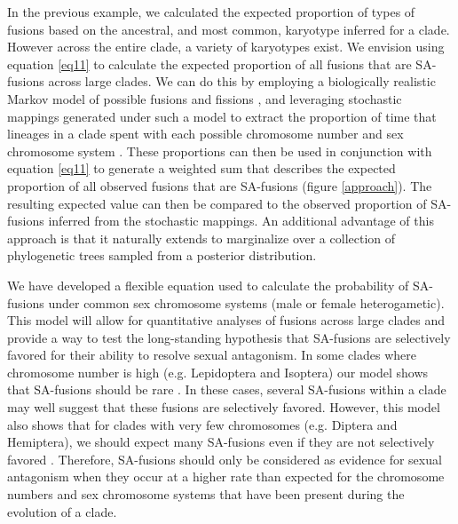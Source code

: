 \documentclass[12pt]{article}
\begin{document}
In the previous example, we calculated the expected proportion of types of fusions based on the ancestral, and most common, karyotype inferred for a clade.
However across the entire clade, a variety of karyotypes exist.
We envision using equation \ref{eq11} to calculate the expected proportion of all fusions that are SA-fusions across large clades.
We can do this by employing a biologically realistic Markov model of possible fusions and fissions \citep{blackmon2019}, and leveraging stochastic mappings generated under such a model to extract the proportion of time that lineages in a clade spent with each possible chromosome number and sex chromosome system \citep{huelsenbeck2003, revell2012}.
These proportions can then be used in conjunction with equation \ref{eq11} to generate a weighted sum that describes the expected proportion of all observed fusions that are SA-fusions (figure \ref{approach}).
The resulting expected value can then be compared to the observed proportion of SA-fusions inferred from the stochastic mappings.
An additional advantage of this approach is that it naturally extends to marginalize over a collection of phylogenetic trees sampled from a posterior distribution.

We have developed a flexible equation used to calculate the probability of SA-fusions under common sex chromosome systems (male or female heterogametic).
This model will allow for quantitative analyses of fusions across large clades and provide a way to test the long-standing hypothesis that SA-fusions are selectively favored for their ability to resolve sexual antagonism.
In some clades where chromosome number is high (e.g. Lepidoptera and Isoptera) our model shows that SA-fusions should be rare \citep{blackmon2017}.
In these cases, several SA-fusions within a clade may well suggest that these fusions are selectively favored. 
However, this model also shows that for clades with very few chromosomes (e.g. Diptera and Hemiptera), we should expect many SA-fusions even if they are not selectively favored \citep{blackmon2017}.
Therefore, SA-fusions should only be considered as evidence for sexual antagonism when they occur at a higher rate than expected for the chromosome numbers and sex chromosome systems that have been present during the evolution of a clade.

\clearpage
\end{document}
